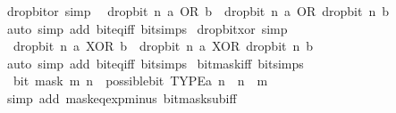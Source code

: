 \begin{isabellebody}
\endisatagproof
{\isafoldproof}%
%
\isadelimproof
\isanewline
%
\endisadelimproof
\isanewline
{}\isamarkupfalse%
\ drop{\isacharunderscore}{\kern0pt}bit{\isacharunderscore}{\kern0pt}or\ {\isacharbrackleft}{\kern0pt}simp{\isacharbrackright}{\kern0pt}{\isacharcolon}{\kern0pt}\isanewline
\ \ {\isacartoucheopen}drop{\isacharunderscore}{\kern0pt}bit\ n\ {\isacharparenleft}{\kern0pt}a\ OR\ b{\isacharparenright}{\kern0pt}\ {\isacharequal}{\kern0pt}\ drop{\isacharunderscore}{\kern0pt}bit\ n\ a\ OR\ drop{\isacharunderscore}{\kern0pt}bit\ n\ b{\isacartoucheclose}\isanewline
%
\isadelimproof
\ \ %
\endisadelimproof
%
\isatagproof
{}\isamarkupfalse%
\ {\isacharparenleft}{\kern0pt}auto\ simp\ add{\isacharcolon}{\kern0pt}\ bit{\isacharunderscore}{\kern0pt}eq{\isacharunderscore}{\kern0pt}iff\ bit{\isacharunderscore}{\kern0pt}simps{\isacharparenright}{\kern0pt}%
\endisatagproof
{\isafoldproof}%
%
\isadelimproof
\isanewline
%
\endisadelimproof
\isanewline
{}\isamarkupfalse%
\ drop{\isacharunderscore}{\kern0pt}bit{\isacharunderscore}{\kern0pt}xor\ {\isacharbrackleft}{\kern0pt}simp{\isacharbrackright}{\kern0pt}{\isacharcolon}{\kern0pt}\isanewline
\ \ {\isacartoucheopen}drop{\isacharunderscore}{\kern0pt}bit\ n\ {\isacharparenleft}{\kern0pt}a\ XOR\ b{\isacharparenright}{\kern0pt}\ {\isacharequal}{\kern0pt}\ drop{\isacharunderscore}{\kern0pt}bit\ n\ a\ XOR\ drop{\isacharunderscore}{\kern0pt}bit\ n\ b{\isacartoucheclose}\isanewline
%
\isadelimproof
\ \ %
\endisadelimproof
%
\isatagproof
{}\isamarkupfalse%
\ {\isacharparenleft}{\kern0pt}auto\ simp\ add{\isacharcolon}{\kern0pt}\ bit{\isacharunderscore}{\kern0pt}eq{\isacharunderscore}{\kern0pt}iff\ bit{\isacharunderscore}{\kern0pt}simps{\isacharparenright}{\kern0pt}%
\endisatagproof
{\isafoldproof}%
%
\isadelimproof
\isanewline
%
\endisadelimproof
\isanewline
{}\isamarkupfalse%
\ bit{\isacharunderscore}{\kern0pt}mask{\isacharunderscore}{\kern0pt}iff\ {\isacharbrackleft}{\kern0pt}bit{\isacharunderscore}{\kern0pt}simps{\isacharbrackright}{\kern0pt}{\isacharcolon}{\kern0pt}\isanewline
\ \ {\isacartoucheopen}bit\ {\isacharparenleft}{\kern0pt}mask\ m{\isacharparenright}{\kern0pt}\ n\ {\isasymlongleftrightarrow}\ possible{\isacharunderscore}{\kern0pt}bit\ TYPE{\isacharparenleft}{\kern0pt}{\isacharprime}{\kern0pt}a{\isacharparenright}{\kern0pt}\ n\ {\isasymand}\ n\ {\isacharless}{\kern0pt}\ m{\isacartoucheclose}\isanewline
%
\isadelimproof
\ \ %
\endisadelimproof
%
\isatagproof
{}\isamarkupfalse%
\ {\isacharparenleft}{\kern0pt}simp\ add{\isacharcolon}{\kern0pt}\ mask{\isacharunderscore}{\kern0pt}eq{\isacharunderscore}{\kern0pt}exp{\isacharunderscore}{\kern0pt}minus{\isacharunderscore}{\kern0pt}{}\ bit{\isacharunderscore}{\kern0pt}mask{\isacharunderscore}{\kern0pt}sub{\isacharunderscore}{\kern0pt}iff{\isacharparenright}{\kern0pt}%

\end{isabellebody}
